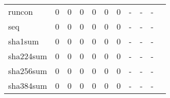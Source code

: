 \begin{longtable}{lp{1.2cm}p{1.2cm}p{1.2cm}p{1.2cm}p{1.2cm}p{1.2cm}p{1.2cm}p{1.2cm}p{1.2cm}p{1.2cm}}
runcon    &                                     0 &                                                  0 &                                                  0 &                                                  0 &                                                  0 &                                                  0 &                                             - &                                                  - &                                                  - \\
seq       &                                     0 &                                                  0 &                                                  0 &                                                  0 &                                                  0 &                                                  0 &                                             - &                                                  - &                                                  - \\
sha1sum   &                                     0 &                                                  0 &                                                  0 &                                                  0 &                                                  0 &                                                  0 &                                             - &                                                  - &                                                  - \\
sha224sum &                                     0 &                                                  0 &                                                  0 &                                                  0 &                                                  0 &                                                  0 &                                             - &                                                  - &                                                  - \\
sha256sum &                                     0 &                                                  0 &                                                  0 &                                                  0 &                                                  0 &                                                  0 &                                             - &                                                  - &                                                  - \\
sha384sum &                                     0 &                                                  0 &                                                  0 &                                                  0 &                                                  0 &                                                  0 &                                             - &                                                  - &                                                  - \\

\end{longtable}
